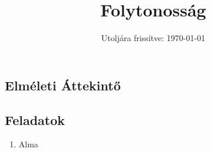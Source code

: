\documentclass[a4paper, 12pt]{scrartcl}
\title{Folytonosság}
\date{Utoljára frissítve: \today}
\begin{document}
\maketitle

\subsection{Elméleti Áttekintő}

\clearpage
\subsection{Feladatok}

\begin{enumerate}
  \item Alma
\end{enumerate}

\end{document}
